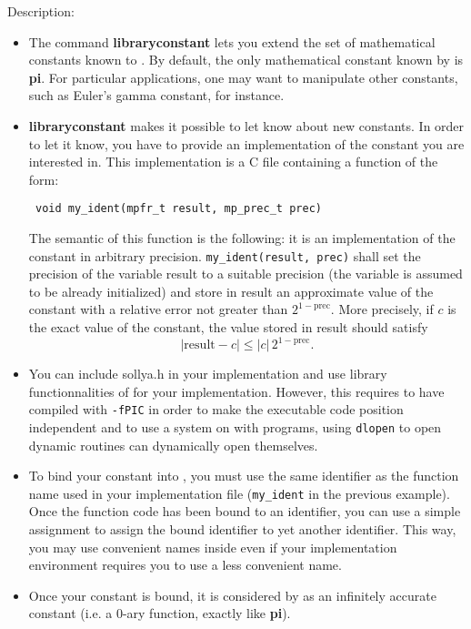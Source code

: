 \noindent Description: \begin{itemize}

\item The command \textbf{libraryconstant} lets you extend the set of mathematical
   constants known to \sollya.
   By default, the only mathematical constant known by \sollya is \textbf{pi}.
   For particular applications, one may want to
   manipulate other constants, such as Euler's gamma constant, for instance.

\item \textbf{libraryconstant} makes it possible to let \sollya know about new constants.
   In order to let it know, you have to provide an implementation of the
   constant you are interested in. This implementation is a C file containing
   a function of the form:
   \begin{verbatim} void my_ident(mpfr_t result, mp_prec_t prec)\end{verbatim}
   The semantic of this function is the following: it is an implementation of
   the constant in arbitrary precision.
   \verb|my_ident(result, prec)| shall set the
   precision of the variable result to a suitable precision (the variable is
   assumed to be already initialized) and store in result an approximate value
   of the constant with a relative error not greater than $2^{1-\mathrm{prec}}$.
   More precisely, if $c$ is the exact value of the constant, the value stored
   in result should satisfy $$|\mathrm{result}-c| \le |c|\,2^{1-\mathrm{prec}}.$$

\item You can include sollya.h in your implementation and use library 
   functionnalities of \sollya for your implementation. However, this requires to
   have compiled \sollya with \texttt{-fPIC} in order to make the \sollya executable
   code position independent and to use a system on with programs, using \texttt{dlopen}
   to open dynamic routines can dynamically open themselves.

\item To bind your constant into \sollya, you must use the same identifier as the
   function name used in your implementation file (\verb|my_ident| in the previous
   example). Once the function code has been bound to an identifier, you can use
   a simple assignment to assign the bound identifier to yet another identifier.
   This way, you may use convenient names inside \sollya even if your
   implementation environment requires you to use a less convenient name.

\item Once your constant is bound, it is considered by \sollya as an infinitely
   accurate constant (i.e. a 0-ary function, exactly like \textbf{pi}).
\end{itemize}
